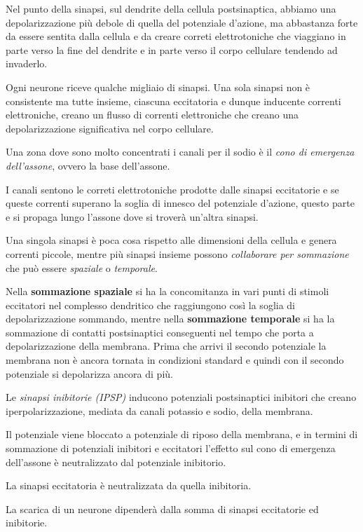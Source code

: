 \documentclass[]{article}
\begin{document}
Nel punto della sinapsi, sul dendrite della cellula postsinaptica,
abbiamo una depolarizzazione più debole di quella del potenziale
d'azione, ma abbastanza forte da essere sentita dalla cellula e da
creare correti elettrotoniche che viaggiano in parte verso la fine del
dendrite e in parte verso il corpo cellulare tendendo ad invaderlo.

Ogni neurone riceve qualche migliaio di sinapsi. Una sola sinapsi non è
consistente ma tutte insieme, ciascuna eccitatoria e dunque inducente
correnti elettroniche, creano un flusso di correnti elettroniche che
creano una depolarizzazione significativa nel corpo cellulare.

Una zona dove sono molto concentrati i canali per il sodio è il
\emph{cono di emergenza dell'assone}, ovvero la base dell'assone.

I canali sentono le correti elettrotoniche prodotte dalle sinapsi
eccitatorie e se queste correnti superano la soglia di innesco del
potenziale d'azione, questo parte e si propaga lungo l'assone dove si
troverà un'altra sinapsi.

Una singola sinapsi è poca cosa rispetto alle dimensioni della cellula e
genera correnti piccole, mentre più sinapsi insieme possono
\emph{collaborare per sommazione} che può essere \emph{spaziale} o
\emph{temporale}.

Nella \textbf{sommazione spaziale} si ha la concomitanza in vari punti
di stimoli eccitatori nel complesso dendritico che raggiungono così la
soglia di depolarizzazione sommando, mentre nella \textbf{sommazione
temporale} si ha la sommazione di contatti postsinaptici conseguenti nel
tempo che porta a depolarizzazione della membrana. Prima che arrivi il
secondo potenziale la membrana non è ancora tornata in condizioni
standard e quindi con il secondo potenziale si depolarizza ancora di
più.

Le \emph{sinapsi inibitorie (IPSP)} inducono potenziali postsinaptici
inibitori che creano iperpolarizzazione, mediata da canali potassio e
sodio, della membrana.

Il potenziale viene bloccato a potenziale di riposo della membrana, e in
termini di sommazione di potenziali inibitori e eccitatori l'effetto sul
cono di emergenza dell'assone è neutralizzato dal potenziale inibitorio.

La sinapsi eccitatoria è neutralizzata da quella inibitoria.

La scarica di un neurone dipenderà dalla somma di sinapsi eccitatorie ed
inibitorie.
\end{document}
